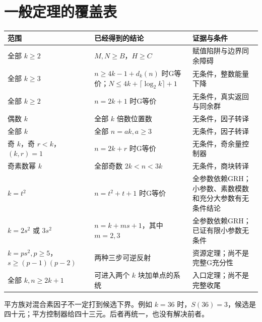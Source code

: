 \documentclass[11pt,a4paper,oneside,openany]{book}
\theoremstyle{definition}\newtheorem{example}[theorem]{例}\newtheorem{conjecture}[theorem]{猜想}
\numberwithin{equation}{chapter}\setcounter{tocdepth}{1}
\begin{document}
\section{一般定理的覆盖表}
\begin{longtable}{p{}p{}p{}}
\toprule 范围&已经得到的结论&证据与条件\\\midrule\endhead
全部 $k\ge2$&$M,N\ge B$，$H\ge C$&赋值陷阱与边界同余障碍\\
全部 $k\ge3$&$n\ge4k-1+d_k(n)$ 时G等价；$N\le4k+\lceil\log_2k\rceil+1$&无条件，整数能量下降\\
全部 $k\ge2$&$n=2k+1$ 时G等价&无条件，真实返回与同余群\\
偶数 $k$&全部 $k$ 倍数位置数&无条件，因子转译\\
全部 $k$&全部 $n=ak,a\ge3$&无条件，因子转译\\
奇 $k$，奇 $r<k$，$(k,r)=1$&$n=2k+r$ 时G等价&无条件，奇余量控制器\\
奇素数幂 $k$&全部奇数 $2k<n<3k$&无条件，商块转译\\
$k=t^2$&$n=t^2+t+1$ 时G等价&全参数依赖GRH；小参数、素数模数和充分大参数有无条件结论\\
$k=2s^2$ 或 $3s^2$&$n=k+ms+1$，其中 $m=2,3$&全参数依赖GRH；已证有限小参数无条件\\
$k=ps^2,p\ge5$，$s\ge(p-1)(p-2)$&两种三步可逆反射&资源定理；尚不是完整G充分性\\
全部 $k,n\ge2k+1$&可进入两个 $k$ 块加单点的系统&入口定理；尚不是完整收尾\\
\bottomrule
\end{longtable}

平方族对混合素因子不一定打到候选下界。例如 $k=36$ 时，$S(36)=3$，候选是四十元；平方控制器给四十三元。后者再统一，也没有解决前者。
\end{document}
